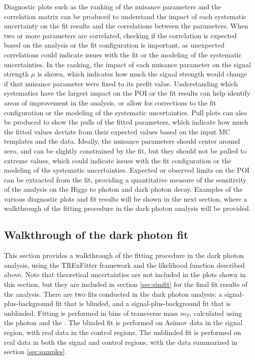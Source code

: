 Diagnostic plots such as the ranking of the nuisance parameters and the correlation matrix can be produced to understand the impact of each systematic uncertainty on the fit results and the correlations between the parameters.
When two or more parameters are correlated, checking if the correlation is expected based on the analysis or the fit configuration is important, as unexpected correlations could indicate issues with the fit or the modeling of the systematic uncertainties.
In the ranking, the impact of each nuisance parameter on the signal strength $\mu$ is shown, which indicates how much the signal strength would change if that nuisance parameter were fixed to its prefit value.
Understanding which systematics have the largest impact on the POI or the fit results can help identify areas of improvement in the analysis, or allow for corrections to the fit configuration or the modeling of the systematic uncertainties.
Pull plots can also be produced to show the pulls of the fitted parameters, which indicate how much the fitted values deviate from their expected values based on the input MC templates and the data.
Ideally, the nuisance parameters should center around zero, and can be slightly constrained by the fit, but they should not be pulled to extreme values, which could indicate issues with the fit configuration or the modeling of the systematic uncertainties.
Expected or observed limits on the POI can be extracted from the fit, providing a quantitative measure of the sensitivity of the analysis on the Higgs to photon and dark photon decay.
Examples of the various diagnostic plots and fit results will be shown in the next section, where a walkthrough of the fitting procedure in the dark photon analysis will be provided.

\subsection{Walkthrough of the dark photon fit}

This section provides a walkthrough of the fitting procedure in the dark photon analysis, using the TRExFitter framework and the likelihood function described above.
Note that theoretical uncertainties are not included in the plots shown in this section, but they are included in section \ref{sec:simfit} for the final fit results of the analysis.
There are two fits conducted in the dark photon analysis: a signal-plus-background fit that is blinded, and a signal-plus-background fit that is unblinded.
Fitting is performed in bins of transverse mass $m_T$, calculated using the photon and the \ETmiss.
The blinded fit is performed on Asimov data in the signal region, with real data in the control regions.
The unblinded fit is performed on real data in both the signal and control regions, with the data summarized in section \ref{sec:samples}.

